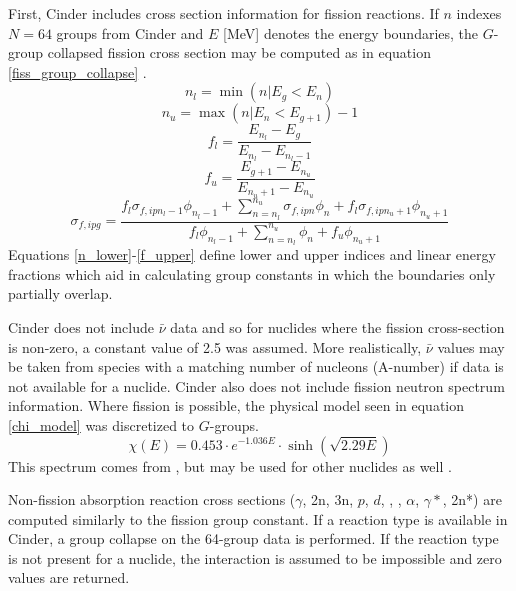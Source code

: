 First, Cinder includes cross section information for fission reactions.  
If $n$ indexes $N=64$ groups from Cinder and $E$ [MeV] denotes the energy boundaries, 
the $G$-group collapsed fission cross section may be computed as in equation \ref{fiss_group_collapse}
\cite{Stacey2007}.
\begin{equation}
\label{n_lower}
n_l = \min(n|E_g<E_n)
\end{equation}
\begin{equation}
\label{n_upper}
n_u = \max(n|E_n<E_{g+1}) - 1
\end{equation}
\begin{equation}
\label{f_lower}
f_l = \frac{E_{n_l} - E_g}{E_{n_l} - E_{n_l-1}}
\end{equation}
\begin{equation}    
\label{f_upper}
f_u = \frac{E_{g+1} - E_{n_u}}{E_{n_u+1} - E_{n_u}}
\end{equation}
\begin{equation}
\label{fiss_group_collapse}
\sigma_{f,ipg} = \frac{f_l\sigma_{f,ipn_l-1}\phi_{n_l-1} + \sum_{n=n_l}^{n_u} \sigma_{f,ipn}\phi_n + f_l\sigma_{f,ipn_u+1}\phi_{n_u+1}}{f_l\phi_{n_l-1} + \sum_{n=n_l}^{n_u} \phi_n  + f_u\phi_{n_u+1}}
\end{equation}
Equations \ref{n_lower}-\ref{f_upper} define lower and upper indices and linear energy fractions
which aid in calculating group constants in which the boundaries only partially overlap.

Cinder does not include $\bar{\nu}$ data and so for nuclides where the fission cross-section is 
non-zero, a constant value of 2.5 was assumed.  
More realistically, $\bar{\nu}$ values may be taken from species with a matching number of nucleons (A-number)
if data is not available for a nuclide.
Cinder also does not include fission neutron 
spectrum information.  Where fission is possible, the physical model seen in equation \ref{chi_model}
was discretized to $G$-groups.
\begin{equation}
\label{chi_model}
\chi(E) = 0.453 \cdot e^{-1.036E} \cdot \sinh\left(\sqrt{2.29E}\right)
\end{equation}
This spectrum comes from , but may be used for other nuclides as well \cite{Lamarsh2002}.

Non-fission absorption reaction cross sections ($\gamma$, 2n, 3n, $p$, $d$, , , 
$\alpha$, $\gamma*$, 2n*) are computed similarly to the fission group constant.  If a reaction 
type is available in Cinder, a group collapse on the 64-group data is performed.  If the reaction 
type is not present for a nuclide, the interaction is assumed to be impossible and zero values
are returned.

